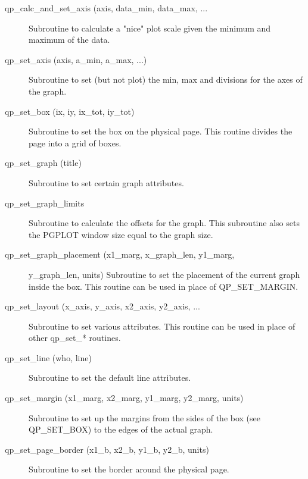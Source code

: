 \begin{description}

\item[qp_calc_and_set_axis (axis, data_min, data_max, ... ] \Newline
     Subroutine to calculate a "nice" plot scale given the minimum and maximum
     of the data. 

\item[qp_set_axis (axis, a_min, a_max, ...)] \Newline
    Subroutine to set (but not plot) the min, max and divisions for the axes of the graph.

\item[qp_set_box (ix, iy, ix_tot, iy_tot) ] \Newline 
     Subroutine to set the box on the physical page.
     This routine divides the page into a grid of boxes. 

\item[qp_set_graph (title)] \Newline 
     Subroutine to set certain graph attributes.

\item[qp_set_graph_limits] \Newline 
     Subroutine to calculate the offsets for the graph.
     This subroutine also sets the PGPLOT window size equal to the graph size.

\item[qp_set_graph_placement (x1_marg, x_graph_len, y1_marg, ] \Newline 
                                                       y_graph_len, units)
Subroutine to set the placement of the current graph inside the box. 
This routine can be used in place of QP_SET_MARGIN.

\item[qp_set_layout (x_axis, y_axis, x2_axis, y2_axis, ...] \Newline 
     Subroutine to set various attributes. This routine can be used
     in place of other qp_set_* routines.

\item[qp_set_line (who, line)] \Newline 
     Subroutine to set the default line attributes.

\item[qp_set_margin (x1_marg, x2_marg, y1_marg, y2_marg, units)] \Newline 
Subroutine to set up the margins from the sides of the box (see QP_SET_BOX)
to the edges of the actual graph.

\item[qp_set_page_border (x1_b, x2_b, y1_b, y2_b, units)] \Newline 
     Subroutine to set the border around the physical page.


\end{description}
